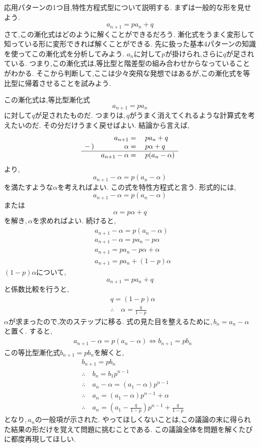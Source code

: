 
応用パターンの1つ目,特性方程式型について説明する.
まずは一般的な形を見せよう.
\[
  a_{n+1}=pa_n+q
\]
さて,この漸化式はどのように解くことができるだろう.
漸化式をうまく変形して知っている形に変形できれば解くことができる.
先に扱った基本4パターンの知識を使ってこの漸化式を分析してみよう.
$a_n$に対して$p$が掛けられ,さらに$q$が足されている.
つまり,この漸化式は,等比型と階差型の組み合わせからなっていることがわかる.
そこから判断して,ここは少々突飛な発想ではあるが,この漸化式を等比型に帰着させることを試みよう.

この漸化式は,等比型漸化式
\[
  a_{n+1}=pa_n
\]
に対して$q$が足されたものだ.
つまりは,\,$q$がうまく消えてくれるような計算式を考えたいのだ.
その分だけうまく戻せばよい.
結論から言えば,
\[
  \begin{array}{rrl}
         & a_{n+1}={}        & pa_n+q        \\
    -\,) & \alpha={}         & p\alpha+q     \\ \hline
         & a_{n+1}-\alpha={} & p(a_n-\alpha)
  \end{array}
\]
より,
\[
  a_{n+1}-\alpha=p(a_n-\alpha)
\]
を満たすような$\alpha$を考えればよい.
この式を特性方程式と言う.
形式的には,
\[
  a_{n+1}-\alpha=p(a_n-\alpha)
\]
または
\[
  \alpha=p\alpha+q
\]
を解き,\,$\alpha$を求めればよい.
続けると,
\begin{align*}
   & a_{n+1}-\alpha=p(a_n-\alpha) \\
   & a_{n+1}-\alpha=pa_n-p\alpha  \\
   & a_{n+1}=pa_n-p\alpha+\alpha  \\
   & a_{n+1}=pa_n+(1-p)\alpha
\end{align*}
$(1-p)\alpha$について,
\[
  a_{n+1}=pa_n+q
\]
と係数比較を行うと,
\begin{align*}
   & q=(1-p)\alpha                         \\
   & \therefore \quad \alpha=\frac{q}{1-p}
\end{align*}
$\alpha$が求まったので,次のステップに移る.
式の見た目を整えるために,\,$b_n=a_n-\alpha$と置く.
すると,
\begin{align*}
   & a_{n+1}-\alpha=p(a_n-\alpha) \iff b_{n+1}=pb_n
\end{align*}
この等比型漸化式$b_{n+1}=pb_n$を解くと,
\begin{align*}
   & b_{n+1}=pb_n                                                             \\
   & \therefore \quad b_n=b_1p^{n-1}                                          \\
   & \therefore \quad a_n-\alpha=(a_1-\alpha)p^{n-1}                          \\
   & \therefore \quad a_n=(a_1-\alpha)p^{n-1}+\alpha                          \\
   & \therefore \quad a_n=\left(a_1-\frac{q}{1-p}\right)p^{n-1}+\frac{q}{1-p}
\end{align*}
となり,\,$a_n$の一般項が示された.
やってほしくないことは,この議論の末に得られた結果の形だけを覚えて問題に挑むことである.
この議論全体を問題を解くたびに都度再現してほしい.

